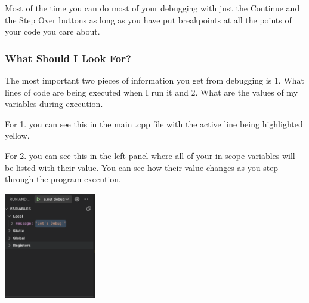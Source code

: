 Most of the time you can do most of your debugging with just the Continue and the Step Over buttons as long as you have put breakpoints at all the points of your code you care about.

\subsubsection{What Should I Look For?}

The most important two pieces of information you get from debugging is 1. What lines of code are being executed when I run it and 2. What are the values of my variables during execution.

For 1. you can see this in the main .cpp file with the active line being highlighted yellow.

For 2. you can see this in the left panel where all of your in-scope variables will be listed with their value. You can see how their value changes as you step through the program execution.

\includegraphics[width=0.3\textwidth]{images/macDebuggerSetup/debugger_mac_11.png}
